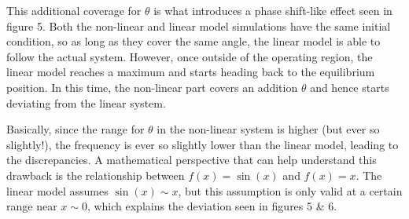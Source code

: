 \documentclass[10pt]{article}
\begin{document}
    This additional coverage for $\theta$ is what introduces a phase shift-like  effect seen in figure 5. Both the non-linear and linear model simulations have the same initial condition, so as long as they cover the same angle, the linear model is able to follow the actual system. However, once outside of the operating region, the linear model reaches a maximum and starts heading back to the equilibrium position. In this time, the non-linear part covers an addition $\theta$ and hence starts deviating from the linear system. 
    
    
    Basically, since the range for $\theta$ in the non-linear system is higher (but ever so slightly!), the frequency is ever so slightly lower than the linear model, leading to the discrepancies. A mathematical perspective that can help understand this drawback is the relationship between $f(x) = \sin(x)$ and $f(x) = x$. The linear model assumes $\sin(x) \sim x$, but this assumption is only valid at a certain range near $x \sim 0$, which explains the deviation seen in figures 5 \& 6. 
    
\end{document}
